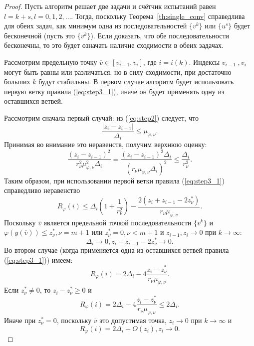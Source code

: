 \begin{proof}
  Пусть алгоритм решает две задачи и счётчик испытаний равен \(l = k + s, l=0,1,2,\dots\).
  Тогда, поскольку Теорема~\ref{th:single_conv} справедлива для обеих задач, как минимум одна из последовательностей
  \(\{v^k\}\) или \(\{u^s\}\) будет бесконечной (пусть это \(\{v^k\}\)).
  Если доказать, что обе последовательности бесконечны, то это будет означать наличие сходимости в обеих задачах.

  Рассмотрим предельную точку \(\overline{v}\in [v_{i-1},v_i]\), где \(i=i(k)\). Индексы \(v_{i-1}\;,v_i\)
  могут быть равны или различаться, но в силу сходимости, при достаточно больших \(k\) будут стабильны.
  В первом случае алгоритм будет использовать первую ветку правила (\ref{eq:step3_1}), иначе он будет применять одну из оставшихся ветвей.

  Рассмотрим сначала первый случай: из (\ref{eq:step2}) следует, что
  \begin{displaymath}
    \frac{|z_i-z_{i-1}|}{\Delta_i} \leqslant \mu_{\varphi,\nu}.
  \end{displaymath}
  Принимая во внимание это неравенств, получим верхнюю оценку:
  \begin{displaymath}
    \frac{(z_i-z_{i-1})^2}{r_\nu^2\mu_{\varphi,\nu}^2\Delta_i}=\frac{(z_i-z_{i-1})^2\Delta_i}{(r_\nu\mu_{\varphi,\nu}\Delta_i)^2}
    \leqslant \frac{\Delta_i}{r_\nu^2}.
  \end{displaymath}
  Таким образом, при использовании первой ветки правила (\ref{eq:step3_1}) справедливо неравенство
  \begin{equation}
    \label{eq:th1}
    R_\varphi(i)\leqslant\Delta_i(1 + \frac{1}{r_\nu^2}) - \frac{2(z_i+z_{i-1}-2z^*_\nu)}{r_\nu\mu_{\varphi,\nu}}.
  \end{equation}
  Поскольку \(\overline{v}\) является предельной точкой последовательности \(\{v^k\}\) и \(\varphi(y(\overline{v}))\leqslant z^*_{\nu}, \nu=m+1\) или
  \(z^*_\nu=0, \nu<m+1\) и \(z_{i-1},z_i\to 0\) при \(k\to\infty\):
  \begin{equation}
    \label{eq:th2}
    \Delta_i\to 0, z_i+z_{i-1} - 2 z_\nu^*\to 0.
  \end{equation}
  Во втором случае (когда применяется одна из оставшихся ветвей правила (\ref{eq:step3_1})) имеем:
  \begin{displaymath}
    R_\varphi(i)=2\Delta_i - 4\frac{z_i-z^*_\nu}{r_\nu\mu_{\varphi,\nu}}.
  \end{displaymath}
  Если \(z^*_\nu \ne 0\), то \(z_i-z^*_\nu \geqslant 0\) и
  \begin{equation}
    \label{eq:th3}
    R_\varphi(i)=2\Delta_i - 4\frac{z_i-z^*_\nu}{r_\nu\mu_{\varphi,\nu}} \leqslant 2\Delta_i.
  \end{equation}
  Иначе при \(z^*_\nu=0\), поскольку \(\overline{v}\) это допустимая точка, \(z_i\to 0\) при \(k\to\infty\) и
  \begin{equation}
    \label{eq:th3_1}
    R_\varphi(i)=2\Delta_i + O(z_i), z_i\to 0.
  \end{equation}


\end{proof}
